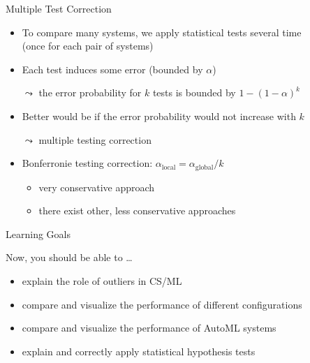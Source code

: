 \begin{frame}[c]{Multiple Test Correction}

\begin{itemize}
	\item To compare many systems, we apply statistical tests several time\\
	(once for each pair of systems)
	\item Each test induces some error (bounded by $\alpha$)
	\item[$\leadsto$] the error probability for $k$ tests is bounded by $1 - (1 - \alpha)^k$
	\pause
	\smallskip
	\item Better would be if the error probability would not increase with $k$
	\item[$\leadsto$] multiple testing correction
	\pause
	\smallskip
	\item Bonferronie testing correction: $\alpha_{\text{local}} = \alpha_{\text{global}} / k$
	\pause
	\begin{itemize}
		\item very conservative approach
		\item there exist other, less conservative approaches
	\end{itemize}
	
\end{itemize}

\end{frame}
\begin{frame}[c]{Learning Goals}

Now, you should be able to \ldots

\begin{itemize}
	\item explain the role of outliers in CS/ML
	\item compare and visualize the performance of different configurations
	\item compare and visualize the performance of AutoML systems
	\item explain and correctly apply statistical hypothesis tests\end{itemize}
\end{frame}
